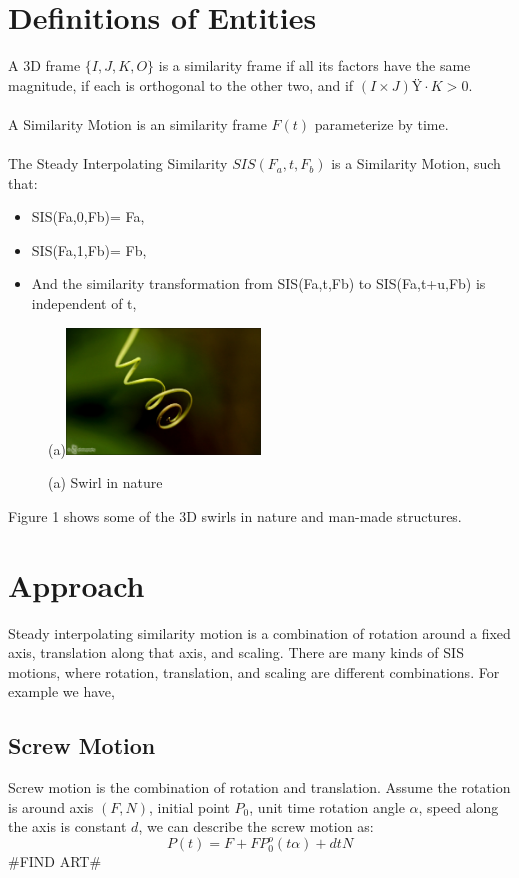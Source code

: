 \documentclass[twoside,11pt]{article}
\begin{document}
\section{Definitions of Entities}


A 3D frame $\{I,J,K,O\}$ is a similarity frame if all its factors have the same magnitude, if each is orthogonal to the other two, and if $(I \times J) \cdot K>0$.\\
\\
A Similarity Motion is an similarity frame $F(t)$ parameterize by time.\\
\\
The Steady Interpolating Similarity $SIS(F_a,t,F_b)$ is a Similarity Motion, such that:
\begin{itemize}
\item SIS(Fa,0,Fb)= Fa,
\item SIS(Fa,1,Fb)= Fb,
\item And the similarity transformation from SIS(Fa,t,Fb) to SIS(Fa,t+u,Fb) is independent of t,
\end{itemize}

\begin{figure}[h]
  \centering
  (a)\includegraphics[width=0.46\textwidth]{plant}
  \caption{(a) Swirl in nature}
  \label{fig:time}
\end{figure}

Figure 1 shows some of the 3D swirls in nature and man-made structures.

\section{Approach}
Steady interpolating similarity motion is a combination of rotation around a fixed axis, translation along that axis, and scaling. There are many kinds of SIS motions, where rotation, translation, and scaling are different combinations. For example we have,

\subsection{Screw Motion}
Screw motion is the combination of rotation and translation. Assume the rotation is around axis $(F, N)$, initial point $P_0$, unit time rotation angle $\alpha$, speed along the axis is constant $d$, we can describe the screw motion as:
\begin{equation}
P(t) = F + FP_0^o(t\alpha) + dtN
\end{equation}
\#FIND ART\#
\end{document}
